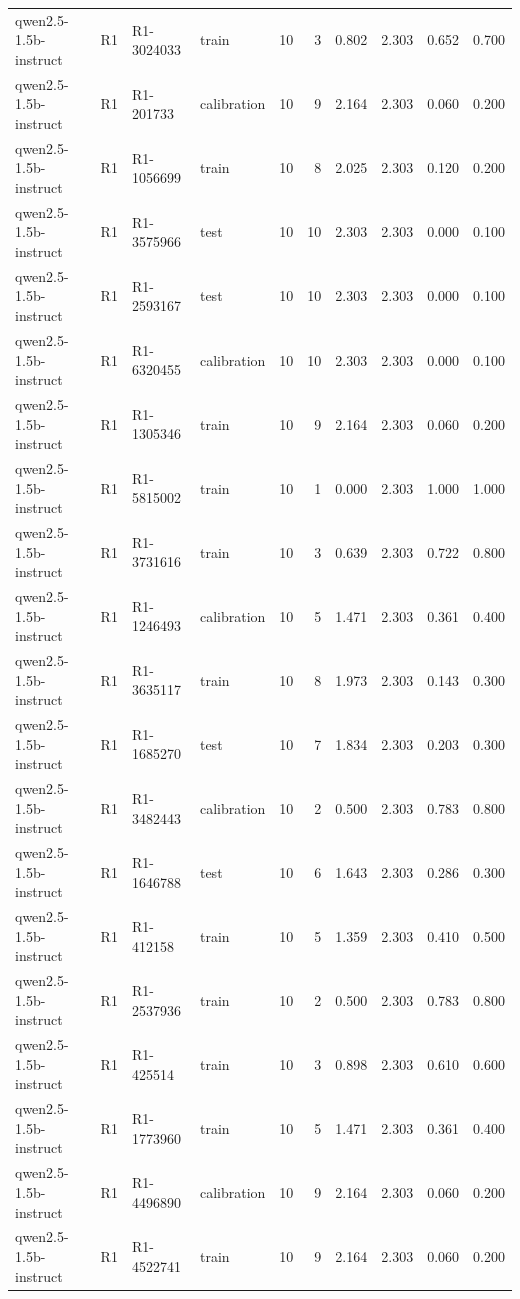 \begin{table}
\begin{tabular}{llllrrrrrr}
qwen2.5-1.5b-instruct & R1 & R1-3024033 & train & 10 & 3 & 0.802 & 2.303 & 0.652 & 0.700 \\
qwen2.5-1.5b-instruct & R1 & R1-201733 & calibration & 10 & 9 & 2.164 & 2.303 & 0.060 & 0.200 \\
qwen2.5-1.5b-instruct & R1 & R1-1056699 & train & 10 & 8 & 2.025 & 2.303 & 0.120 & 0.200 \\
qwen2.5-1.5b-instruct & R1 & R1-3575966 & test & 10 & 10 & 2.303 & 2.303 & 0.000 & 0.100 \\
qwen2.5-1.5b-instruct & R1 & R1-2593167 & test & 10 & 10 & 2.303 & 2.303 & 0.000 & 0.100 \\
qwen2.5-1.5b-instruct & R1 & R1-6320455 & calibration & 10 & 10 & 2.303 & 2.303 & 0.000 & 0.100 \\
qwen2.5-1.5b-instruct & R1 & R1-1305346 & train & 10 & 9 & 2.164 & 2.303 & 0.060 & 0.200 \\
qwen2.5-1.5b-instruct & R1 & R1-5815002 & train & 10 & 1 & 0.000 & 2.303 & 1.000 & 1.000 \\
qwen2.5-1.5b-instruct & R1 & R1-3731616 & train & 10 & 3 & 0.639 & 2.303 & 0.722 & 0.800 \\
qwen2.5-1.5b-instruct & R1 & R1-1246493 & calibration & 10 & 5 & 1.471 & 2.303 & 0.361 & 0.400 \\
qwen2.5-1.5b-instruct & R1 & R1-3635117 & train & 10 & 8 & 1.973 & 2.303 & 0.143 & 0.300 \\
qwen2.5-1.5b-instruct & R1 & R1-1685270 & test & 10 & 7 & 1.834 & 2.303 & 0.203 & 0.300 \\
qwen2.5-1.5b-instruct & R1 & R1-3482443 & calibration & 10 & 2 & 0.500 & 2.303 & 0.783 & 0.800 \\
qwen2.5-1.5b-instruct & R1 & R1-1646788 & test & 10 & 6 & 1.643 & 2.303 & 0.286 & 0.300 \\
qwen2.5-1.5b-instruct & R1 & R1-412158 & train & 10 & 5 & 1.359 & 2.303 & 0.410 & 0.500 \\
qwen2.5-1.5b-instruct & R1 & R1-2537936 & train & 10 & 2 & 0.500 & 2.303 & 0.783 & 0.800 \\
qwen2.5-1.5b-instruct & R1 & R1-425514 & train & 10 & 3 & 0.898 & 2.303 & 0.610 & 0.600 \\
qwen2.5-1.5b-instruct & R1 & R1-1773960 & train & 10 & 5 & 1.471 & 2.303 & 0.361 & 0.400 \\
qwen2.5-1.5b-instruct & R1 & R1-4496890 & calibration & 10 & 9 & 2.164 & 2.303 & 0.060 & 0.200 \\
qwen2.5-1.5b-instruct & R1 & R1-4522741 & train & 10 & 9 & 2.164 & 2.303 & 0.060 & 0.200 \\

\end{tabular}
\end{table}
